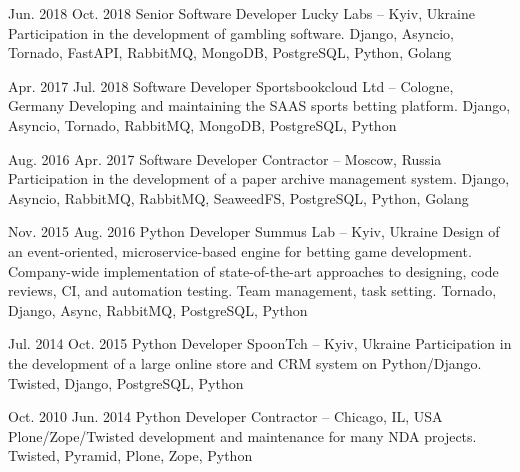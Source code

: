 \documentclass[a4paper]{mcresume}
\begin{document}
{\begin{twenty}
    \workitem
    {Jun. 2018}
    {Oct. 2018}
    {Senior Software Developer}
    {Lucky Labs -- Kyiv, Ukraine}
    {\onsite}
    {Participation in the development of gambling software.}
    {Django, Asyncio, Tornado, FastAPI, RabbitMQ, MongoDB, PostgreSQL, Python, Golang}

    \workitem
    {Apr. 2017}
    {Jul. 2018}
    {Software Developer}
    {Sportsbookcloud Ltd -- Cologne, Germany}
    {\remote}
    {Developing and maintaining the SAAS sports betting platform.}
    {Django, Asyncio, Tornado, RabbitMQ, MongoDB, PostgreSQL, Python}

    \workitem
    {Aug. 2016}
    {Apr. 2017}
    {Software Developer}
    {Contractor -- Moscow, Russia}
    {\remote}
    {Participation in the development of a paper archive management system.}
    {Django, Asyncio, RabbitMQ, RabbitMQ, SeaweedFS, PostgreSQL, Python, Golang}

    \workitem
    {Nov. 2015}
    {Aug. 2016}
    {Python Developer}
    {Summus Lab -- Kyiv, Ukraine}
    {\onsite}
    {Design of an event-oriented, microservice-based engine for betting game development.
    Company-wide implementation of state-of-the-art approaches to designing, code reviews, CI, and automation testing.
    Team management, task setting.}
    {Tornado, Django, Async, RabbitMQ, PostgreSQL, Python}
    {\small}

    \workitem
    {Jul. 2014}
    {Oct. 2015}
    {Python Developer}
    {SpoonTch -- Kyiv, Ukraine}
    {\remote}
    {Participation in the development of a large online store and CRM system on Python/Django.}
    {Twisted, Django, PostgreSQL, Python}
    {\small}


    \workitem
    {Oct. 2010}
    {Jun. 2014}
    {Python Developer}
    {Contractor -- Chicago, IL, USA}
    {\remote}
    {Plone/Zope/Twisted development and maintenance for many NDA projects.}
    {Twisted, Pyramid, Plone, Zope, Python}

    \end{twenty}

}
\end{document}
